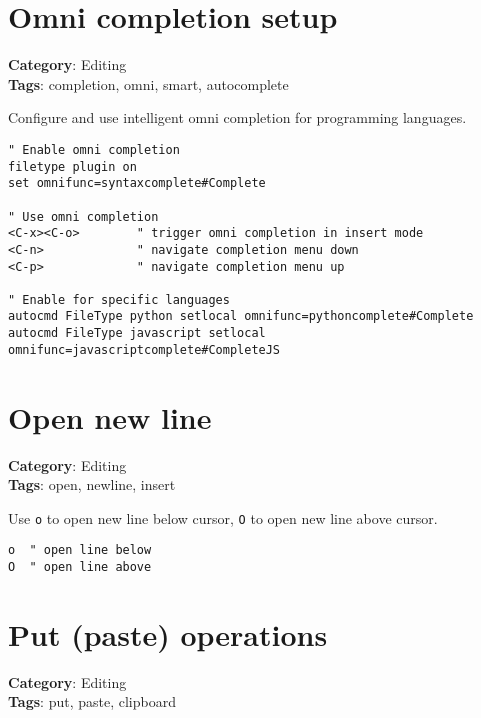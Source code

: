 {{{{\section{Omni completion setup}

\textbf{Category}: Editing\\ \textbf{Tags}: completion, omni, smart, autocomplete
\vspace{0.5cm}

Configure and use intelligent omni completion for programming languages.

\begin{Exa*}{}
\begin{Verbatim}[fontsize=\footnotesize, breaklines, breakanywhere]
" Enable omni completion
filetype plugin on
set omnifunc=syntaxcomplete#Complete

" Use omni completion
<C-x><C-o>        " trigger omni completion in insert mode
<C-n>             " navigate completion menu down
<C-p>             " navigate completion menu up

" Enable for specific languages
autocmd FileType python setlocal omnifunc=pythoncomplete#Complete
autocmd FileType javascript setlocal omnifunc=javascriptcomplete#CompleteJS
\end{Verbatim}
\end{Exa*}

\section{Open new line}

\textbf{Category}: Editing\\ \textbf{Tags}: open, newline, insert
\vspace{0.5cm}

Use {\footnotesize \Verb§o§} to open new line below cursor, {\footnotesize \Verb§O§} to open new line above cursor.

\begin{Exa*}{}
\begin{Verbatim}[fontsize=\footnotesize, breaklines, breakanywhere]
o  " open line below
O  " open line above
\end{Verbatim}
\end{Exa*}

\section{Put (paste) operations}

\textbf{Category}: Editing\\ \textbf{Tags}: put, paste, clipboard
\vspace{0.5cm}

}}}}
